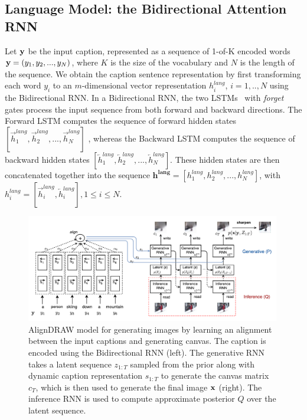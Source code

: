 \documentclass{article} %
\newcommand{\hlang}{h^{lang}}
\newcommand{\hlangall}{\boldsymbol{h^{lang}}}
\newcommand{\icaption}{{\bf{y}}}
\newcommand{\oimage}{{\bf{x}}}
\begin{document}
\subsection{Language Model: the Bidirectional Attention RNN}
\vspace{-0.05in}
\label{sec:lang}
Let $\icaption$ be the input caption, represented as a sequence
of 1-of-K encoded words 
${\bf y} = (y_{1}, y_{2}, ..., y_{N})$, 
where $K$ is the size of the vocabulary and $N$ is the length of the sequence.
We obtain the caption sentence representation by first 
transforming each word $y_{i}$ to an $m$-dimensional 
vector representation $\hlang_{i}$, $i=1,..,N$ using the Bidirectional RNN. In a Bidirectional RNN, the two LSTMs~\citep{hochreiter_lstm} with \textit{forget} gates 
\citep{gers_forget} process the input sequence from both forward and backward directions. The Forward LSTM computes the sequence of forward hidden states $[\overrightarrow{h}^{lang}_{1}, \overrightarrow{h}^{lang}_{2}, ..., \overrightarrow{h}^{lang}_{N}]$ , whereas the Backward LSTM computes the sequence of backward hidden states $[\overleftarrow{h}^{lang}_{1}, \overleftarrow{h}^{lang}_{2}, ..., \overleftarrow{h}^{lang}_{N}]$. 
These hidden states are then concatenated together 
into the sequence $\hlangall = [\hlang_{1}, \hlang_{2}, ..., \hlang_{N}]$, 
with $\hlang_{i} = [\overrightarrow{h}^{lang}_{i}, \overleftarrow{h}^{lang}_{i}], 1\leq i\leq N$.


\begin{figure}[t!]
\vspace{-0.3in}
\captionsetup[subfigure]{labelformat=empty}
\begin{center}
\includegraphics[width=0.99\textwidth]{figures/alignDrawAnnotated.pdf}\quad
%
\end{center}
\vspace{-0.1in}
\caption{\small AlignDRAW model for generating images by learning an alignment between the input captions
and generating canvas. The caption is encoded using 
the Bidirectional RNN (left). The generative RNN takes a latent sequence $z_{1:T}$ sampled from the 
prior along with dynamic caption representation $s_{1:T}$ to generate the canvas matrix $c_T$, which is then
used to generate the final image $\oimage$ (right).
The inference RNN is used to compute approximate posterior $Q$ over the latent sequence.} 
\label{fig:figmodel}
\vspace{-0.2in}
\end{figure}
\end{document}

